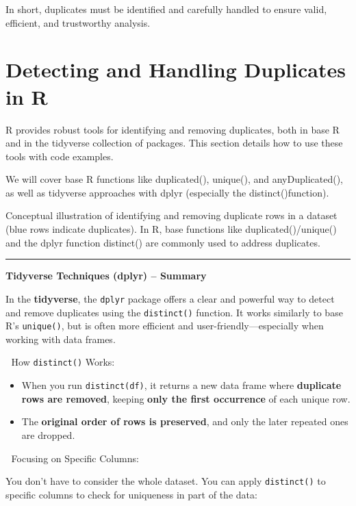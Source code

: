 \documentclass[
  man,
  floatsintext,
  longtable,
  nolmodern,
  notxfonts,
  notimes,
  colorlinks=true,linkcolor=blue,citecolor=blue,urlcolor=blue]{apa7}
\providecommand{\tightlist}{%
  \setlength{\itemsep}{0pt}\setlength{\parskip}{0pt}}
\begin{document}
In short, duplicates must be identified and carefully handled to ensure
valid, efficient, and trustworthy analysis.

\section{Detecting and Handling Duplicates in
R}\label{detecting-and-handling-duplicates-in-r}

R provides robust tools for identifying and removing duplicates, both in
base R and in the tidyverse collection of packages. This section details
how to use these tools with code examples.

We will cover base R functions like duplicated(), unique(), and
anyDuplicated(), as well as tidyverse approaches with dplyr (especially
the distinct()function).

Conceptual illustration of identifying and removing duplicate rows in a
dataset (blue rows indicate duplicates). In R, base functions like
duplicated()/unique() and the dplyr function distinct() are commonly
used to address duplicates.

\begin{center}\rule{0.5\linewidth}{0.5pt}\end{center}

\textbf{Tidyverse Techniques (dplyr) -- Summary}

In the \textbf{tidyverse}, the \texttt{dplyr} package offers a clear and
powerful way to detect and remove duplicates using the
\texttt{distinct()} function. It works similarly to base R's
\texttt{unique()}, but is often more efficient and
user-friendly---especially when working with data frames.

🔹 How \texttt{distinct()} Works:

\begin{itemize}
\tightlist
\item
  When you run \texttt{distinct(df)}, it returns a new data frame where
  \textbf{duplicate rows are removed}, keeping \textbf{only the first
  occurrence} of each unique row.
\item
  The \textbf{original order of rows is preserved}, and only the later
  repeated ones are dropped.
\end{itemize}

🔹 Focusing on Specific Columns:

You don't have to consider the whole dataset. You can apply
\texttt{distinct()} to specific columns to check for uniqueness in part
of the data:
\end{document}
